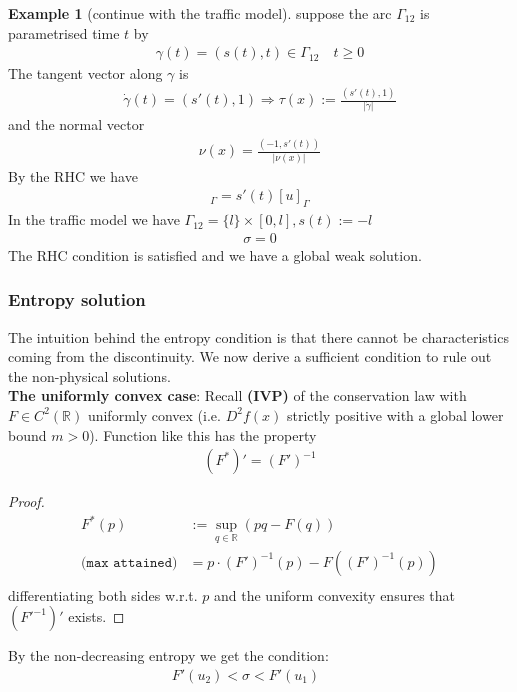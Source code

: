 \documentclass[a4paper,11pt,oneside,fleqn]{book}
\theoremstyle{definition}
\newtheorem*{example}{Example}
\theoremstyle{remark}
\begin{document}
\begin{example}[continue with the traffic model]
suppose the arc $\Gamma_{12}$ is parametrised time $t$ by 
\begin{align*}
	\gamma(t) = (s(t), t) \in \Gamma_{12} \quad t \ge 0
\end{align*}
The tangent vector along $\gamma$ is
\begin{align*}
	\dot{\gamma}(t) = (s'(t), 1) \Rightarrow 
	\tau(x):= \frac{(s'(t), 1)}{|\dot{\gamma}|}
\end{align*}
and the normal vector
\begin{align*}
	\nu(x) = \frac{(-1, s'(t))}{|\nu(x)|}
\end{align*}
By the RHC we have
\begin{align*}
	[F(u)]_\Gamma = s'(t) [u]_\Gamma
\end{align*}
In the traffic model we have $\Gamma_{12} = \{l\} \times [0, l], s(t) := -l$
\begin{align*}
	\sigma = 0
\end{align*}
The RHC condition is satisfied and we have a global weak solution. 
\end{example}


\subsubsection*{Entropy solution}
The intuition behind the entropy condition is that there cannot be characteristics coming from the discontinuity. We now derive a sufficient condition to rule out the non-physical solutions.
\quad\\
\textbf{The uniformly convex case}: Recall \textbf{(IVP)} of the conservation law with $F \in C^2(\mathbb{R})$ uniformly convex (i.e. $D^2f(x)$ strictly positive with a global lower bound $m > 0$). Function like this has the property
\begin{align*}
	(F^*)' = (F')^{-1}
\end{align*}
\begin{proof}
\begin{align*}
	F^*(p)&:= \sup_{q \in \mathbb{R}}(p q - F(q))\\
	\texttt{(max attained)}
	&= p \cdot (F')^{-1}(p) - F((F')^{-1}(p))\\
\end{align*}
differentiating both sides w.r.t. $p$ and the uniform convexity ensures that $(F'^{-1})'$ exists. 
\end{proof}

By the non-decreasing entropy we get the condition:
\begin{align*}
	F'(u_2) < \sigma < F'(u_1) \qquad 
\end{align*}
\end{document}
